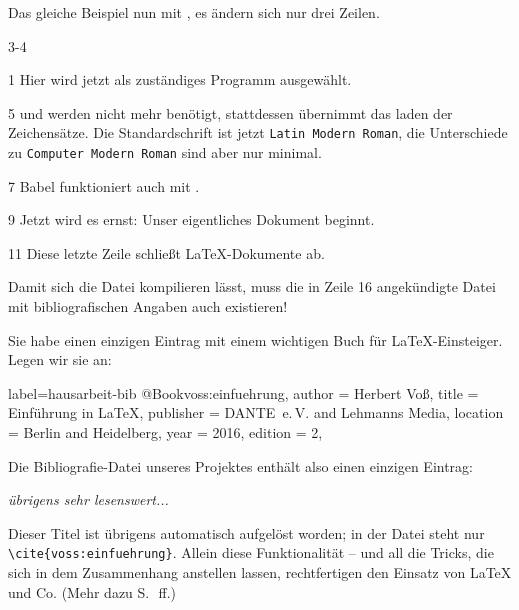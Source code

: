 Das gleiche Beispiel nun mit \LuaLaTeX{}, es ändern sich nur drei Zeilen.
 

\begin{labeling}{3-4}

 \item[1] Hier wird jetzt \LuaLaTeX{} als zuständiges Programm ausgewählt. 
  
 \item[5]  und  werden nicht mehr benötigt,
   stattdessen übernimmt  das laden der Zeichensätze.  Die
   Standardschrift ist jetzt \texttt{Latin Modern Roman}, die Unterschiede
   zu \texttt{Computer Modern Roman} sind aber nur minimal. 

 \item[7] Babel funktioniert auch mit \LuaLaTeX{}.
 
 \item[9] Jetzt wird es ernst: Unser eigentliches Dokument beginnt.
 
 \item[11] Diese letzte Zeile schließt \LaTeX -Dokumente ab.

 \end{labeling}

 

Damit sich die Datei kompilieren lässt, muss die in Zeile 16 angekündigte Datei mit 
bibliografischen Angaben auch existieren!

Sie habe einen einzigen Eintrag mit einem wichtigen Buch für \LaTeX -Einsteiger.
Legen wir sie an:

\begin{lfgwcode}{label={hausarbeit-bib}}
@Book{voss:einfuehrung,
 author = {Herbert Voß}, 
 title = {Einführung in \LaTeX},
 publisher = {DANTE~e.\,V. and Lehmanns Media},
 location = {Berlin and Heidelberg},
 year = {2016},
 edition = {2},
}
\end{lfgwcode}

Die Bibliografie-Datei unseres Projektes enthält also einen einzigen Eintrag:
\bigskip

\parbox{40mm}{
   \emph{übrigens sehr lesenswert...}
}
\bigskip

Dieser Titel ist übrigens automatisch aufgelöst worden; 
in der Datei steht nur \lstinline/\cite{voss:einfuehrung}/.
Allein diese Funktionalität -- und all die Tricks, die sich in dem Zusammenhang anstellen
lassen, rechtfertigen den Einsatz von \LaTeX{} und Co. (Mehr dazu S.~\pageref{biblatex}\,ff.)

\endinput


